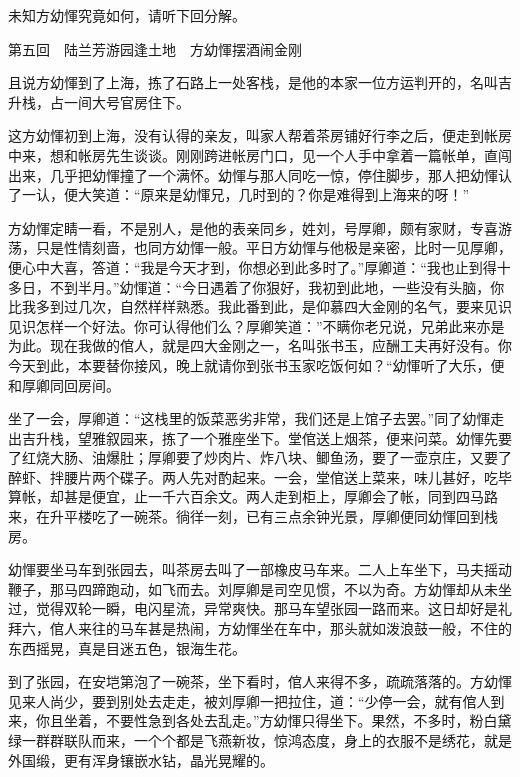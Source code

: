 \documentclass[12pt,UTF8]{ctexbook}
\begin{document}
{{{未知方幼惲究竟如何，请听下回分解。





第五回　陆兰芳游园逢土地　方幼惲摆酒闹金刚





且说方幼惲到了上海，拣了石路上一处客栈，是他的本家一位方运判开的，名叫吉升栈，占一间大号官房住下。

这方幼惲初到上海，没有认得的亲友，叫家人帮着茶房铺好行李之后，便走到帐房中来，想和帐房先生谈谈。刚刚跨进帐房门口，见一个人手中拿着一篇帐单，直闯出来，几乎把幼惲撞了一个满怀。幼惲与那人同吃一惊，停住脚步，那人把幼惲认了一认，便大笑道：“原来是幼惲兄，几时到的？你是难得到上海来的呀！”

方幼惲定睛一看，不是别人，是他的表亲同乡，姓刘，号厚卿，颇有家财，专喜游荡，只是性情刻啬，也同方幼惲一般。平日方幼惲与他极是亲密，比时一见厚卿，便心中大喜，答道：“我是今天才到，你想必到此多时了。”厚卿道：“我也止到得十多日，不到半月。”幼惲道：“今日遇着了你狠好，我初到此地，一些没有头脑，你比我多到过几次，自然样样熟悉。我此番到此，是仰慕四大金刚的名气，要来见识见识怎样一个好法。你可认得他们么？厚卿笑道：”不瞒你老兄说，兄弟此来亦是为此。现在我做的倌人，就是四大金刚之一，名叫张书玉，应酬工夫再好没有。你今天到此，本要替你接风，晚上就请你到张书玉家吃饭何如？“幼惲听了大乐，便和厚卿同回房间。

坐了一会，厚卿道：“这栈里的饭菜恶劣非常，我们还是上馆子去罢。”同了幼惲走出吉升栈，望雅叙园来，拣了一个雅座坐下。堂倌送上烟茶，便来问菜。幼惲先要了红烧大肠、油爆肚；厚卿要了炒肉片、炸八块、鲫鱼汤，要了一壶京庄，又要了醉虾、拌腰片两个碟子。两人先对酌起来。一会，堂倌送上菜来，味儿甚好，吃毕算帐，却甚是便宜，止一千六百余文。两人走到柜上，厚卿会了帐，同到四马路来，在升平楼吃了一碗茶。徜徉一刻，已有三点余钟光景，厚卿便同幼惲回到栈房。

幼惲要坐马车到张园去，叫茶房去叫了一部橡皮马车来。二人上车坐下，马夫摇动鞭子，那马四蹄跑动，如飞而去。刘厚卿是司空见惯，不以为奇。方幼惲却从未坐过，觉得双轮一瞬，电闪星流，异常爽快。那马车望张园一路而来。这日却好是礼拜六，倌人来往的马车甚是热闹，方幼惲坐在车中，那头就如泼浪鼓一般，不住的东西摇晃，真是目迷五色，银海生花。

到了张园，在安垲第泡了一碗茶，坐下看时，倌人来得不多，疏疏落落的。方幼惲见来人尚少，要到别处去走走，被刘厚卿一把拉住，道：“少停一会，就有倌人到来，你且坐着，不要性急到各处去乱走。”方幼惲只得坐下。果然，不多时，粉白黛绿一群群联队而来，一个个都是飞燕新妆，惊鸿态度，身上的衣服不是绣花，就是外国缎，更有浑身镶嵌水钻，晶光晃耀的。

}}}
\end{document}
